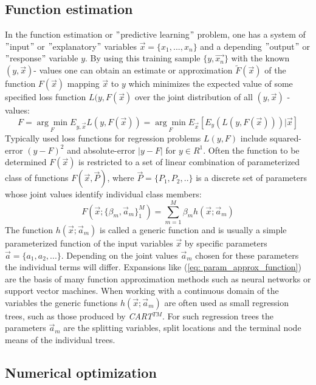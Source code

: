 \documentclass[12pt, a4paper]{article}
\begin{document}
\subsection{Function estimation}
In the function estimation or $"$predictive learning$"$ problem, one has a system of $"$input$"$ or $"$explanatory$"$ variables $\vec{x} = \{x_1,...,x_n\}$ and a depending $"$output$"$ or $"$response$"$ variable $y$. By using this training sample $\{y,\vec{x_n}\}$ with the known $(y,\vec{x})$- values one can obtain an estimate or approximation $\tilde{F}(\vec{x})$ of the function $F(\vec{x})$ mapping $\vec{x}$ to $y$ which minimizes the expected value of some specified loss function $L(y,F(\vec{x})$ over the joint distribution of all $(y,\vec{x})$ -values:
\begin{equation}
    F = \underset{F}{\arg\min} E_{y,\vec{x}} L(y,F(\vec{x})) = \underset{F}{\arg\min} E_{\vec{x}} [E_y (L(y,F(\vec{x})))|\vec{x}]
\end{equation}
Typically used loss functions for regression problems $L(y,F)$ include squared-error $(y - F)^2$ and absolute-error $|y - F|$ for $y \in R^1$.
Often the function to be determined $F(\vec{x})$ is restricted to a set of linear combination of parameterized class of functions $F(\vec{x},\vec{P})$, where $\vec{P} = \{P_1,P_2,..\}$ is a discrete set of parameters whose joint values identify individual class members:
\begin{equation}
    F(\vec{x};\{\beta_m, \vec{a}_m\}_1^M) = \sum_{m=1}^{M} \beta_m h(\vec{x};\vec{a}_m)
    \label{eq: param_approx_function}
\end{equation}
The function $h(\vec{x};\vec{a}_m)$ is called a generic function and is usually a simple parameterized function of the input variables $\vec{x}$ by specific parameters $\vec{a} = \{a_1,a_2,...\}$. Depending on the joint values $\vec{a}_m$ chosen for these parameters the individual terms will differ. Expansions like (\ref{eq: param_approx_function}) are the basis of many function approximation methods such as neural networks or support vector machines. When working with a continuous domain of the variables the generic functions $h(\vec{x};\vec{a}_m)$ are often used as small regression trees, such as those produced by \textit{CART}$^{TM}$. For such regression trees the parameters $\vec{a}_m$ are the splitting variables, split locations and the terminal node means of the individual trees.

\newpage
\subsection{Numerical optimization}
\end{document}
